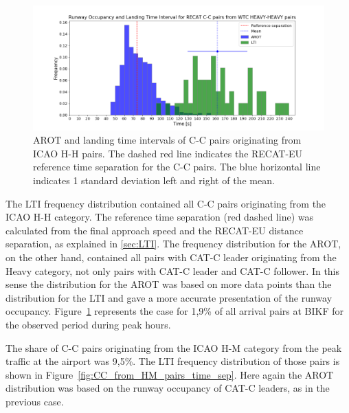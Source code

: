 \begin{figure}[h]
    \centering
    \includegraphics[width=1\textwidth]{graphics/fig_CC_from_HH_pairs_time_sep.png}
    \caption[AROT and LTI of C-C pairs originating from ICAO H-H pairs]{AROT and landing time intervals of C-C pairs originating from ICAO H-H pairs. The dashed red line indicates the RECAT-EU reference time separation for the C-C pairs. The blue horizontal line indicates 1 standard deviation left and right of the mean.}
    \label{fig:CC_from_HH_pairs_time_sep}
\end{figure}

The LTI frequency distribution contained all C-C pairs originating from the ICAO H-H category. The reference time separation (red dashed line) was calculated from the final approach speed and the RECAT-EU distance separation, as explained in \ref{sec:LTI}. The frequency distribution for the AROT, on the other hand, contained all pairs with CAT-C leader originating from the Heavy category, not only pairs with CAT-C leader and CAT-C follower. In this sense the distribution for the AROT was based on more data points than the distribution for the LTI and gave a more accurate presentation of the runway occupancy. Figure~\ref{fig:CC_from_HH_pairs_time_sep} represents the case for 1,9\% of all arrival pairs at BIKF for the observed period during peak hours.

The share of C-C pairs originating from the ICAO H-M category from the peak traffic at the airport was 9,5\%.  The LTI frequency distribution of those pairs is shown in Figure~\ref{fig:CC_from_HM_pairs_time_sep}. Here again the AROT distribution was based on the runway occupancy of CAT-C leaders, as in the previous case. 
 
